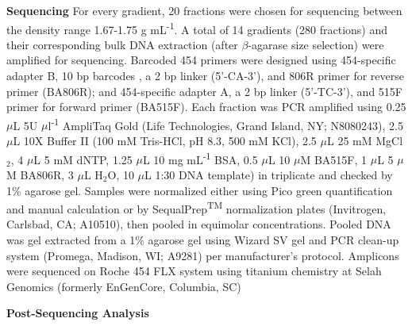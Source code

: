 \textbf{Sequencing}  For every gradient, 20 fractions were chosen for sequencing between the density range 1.67-1.75 g mL\textsuperscript{-1}. A total of 14 gradients (280 fractions) and their corresponding bulk DNA extraction (after $\beta$-agarase size selection) were amplified for sequencing. Barcoded 454 primers were designed using 454-specific adapter B, 10 bp barcodes \cite{Hamady_2008}, a 2 bp linker (5'-CA-3'), and 806R primer for reverse primer (BA806R); and 454-specific adapter A, a 2 bp linker (5'-TC-3'), and 515F primer for forward primer (BA515F). Each fraction was PCR amplified using 0.25 $\mu$L 5U $\mu$l\textsuperscript{-1} AmpliTaq Gold (Life Technologies, Grand Island, NY; N8080243), 2.5 $\mu$L 10X Buffer II (100 mM Tris-HCl, pH 8.3, 500 mM KCl), 2.5 $\mu$L 25 mM MgCl$_{2}$, 4 $\mu$L 5 mM dNTP, 1.25 $\mu$L 10 mg mL\textsuperscript{-1} BSA, 0.5 $\mu$L 10 $\mu$M BA515F, 1 $\mu$L 5 $\mu$M BA806R, 3 $\mu$L H$_{2}$O, 10 $\mu$L 1:30 DNA template) in triplicate and checked by 1\% agarose gel. Samples were normalized either using Pico green quantification and manual calculation or by SequalPrep\textsuperscript{TM} normalization plates (Invitrogen, Carlsbad, CA; A10510), then pooled in equimolar concentrations. Pooled DNA was gel extracted from a 1\% agarose gel using Wizard SV gel and PCR clean-up system (Promega, Madison, WI; A9281) per manufacturer's protocol.  Amplicons were sequenced on Roche 454 FLX system using titanium chemistry at Selah Genomics (formerly EnGenCore, Columbia, SC)    

\textbf{Post-Sequencing Analysis}
 